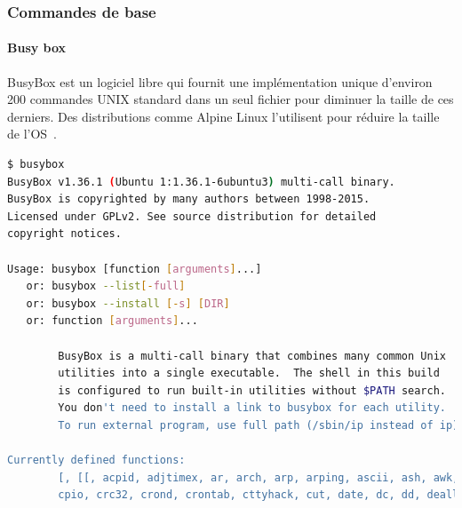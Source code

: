 \documentclass{beamer}
\begin{document}
    \begin{frame}[fragile]
        \transdissolve
        \frametitle{Commandes de base}
        \framesubtitle{Busy box}
        BusyBox est un logiciel libre qui fournit une implémentation unique d'environ 200 commandes UNIX standard dans un seul fichier pour diminuer la taille de ces derniers.
        Des distributions comme Alpine Linux l'utilisent pour réduire la taille de l'OS~.
        \begin{lstlisting}[language=bash,basicstyle=\tiny\ttfamily]
$ busybox
BusyBox v1.36.1 (Ubuntu 1:1.36.1-6ubuntu3) multi-call binary.
BusyBox is copyrighted by many authors between 1998-2015.
Licensed under GPLv2. See source distribution for detailed
copyright notices.

Usage: busybox [function [arguments]...]
   or: busybox --list[-full]
   or: busybox --install [-s] [DIR]
   or: function [arguments]...

        BusyBox is a multi-call binary that combines many common Unix
        utilities into a single executable.  The shell in this build
        is configured to run built-in utilities without $PATH search.
        You don't need to install a link to busybox for each utility.
        To run external program, use full path (/sbin/ip instead of ip).

Currently defined functions:
        [, [[, acpid, adjtimex, ar, arch, arp, arping, ascii, ash, awk, base64, basename, bc, blkdiscard, blockdev, brctl, bunzip2, busybox, bzcat, bzip2, cal, cat, chgrp, chmod, chown, chpasswd, chroot, chvt, clear, cmp, cp,
        cpio, crc32, crond, crontab, cttyhack, cut, date, dc, dd, deallocvt, depmod, devmem, df, diff, dirname, dmesg, dnsdomainname, dos2unix, dpkg, dpkg-deb, du, dumpkmap, dumpleases, echo, ed,
        \end{lstlisting}
    \end{frame}
\end{document}
